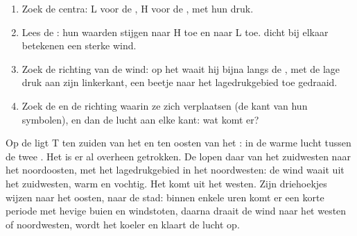 \begin{method}
\begin{enumerate}
  \item Zoek de centra: L voor de , H voor de ,
        met hun druk.
  \item Lees de : hun waarden stijgen naar H toe en  naar L
        toe.  dicht bij elkaar betekenen een sterke wind.
  \item Zoek de richting van de wind: op het  waait hij
        bijna langs de , met de lage druk aan zijn linkerkant, een
        beetje naar het lagedrukgebied toe gedraaid.
  \item Zoek de  en de richting waarin ze zich verplaatsen (de kant
        van hun symbolen), en dan de lucht aan elke kant: wat komt er?
\end{enumerate}
\end{method}

\begin{example}
Op de  ligt T ten zuiden van het  en ten oosten van het
: in de warme lucht tussen de twee . Het  is er
al overheen getrokken. De  lopen daar van het zuidwesten naar het
noordoosten, met het lagedrukgebied in het noordwesten: de wind waait uit
het zuidwesten, warm en vochtig. Het  komt uit het westen. Zijn
driehoekjes wijzen naar het oosten, naar de stad: binnen enkele uren komt
er een korte periode met hevige buien en windstoten, daarna draait de wind
naar het westen of noordwesten, wordt het koeler en klaart de lucht op.
\end{example}

